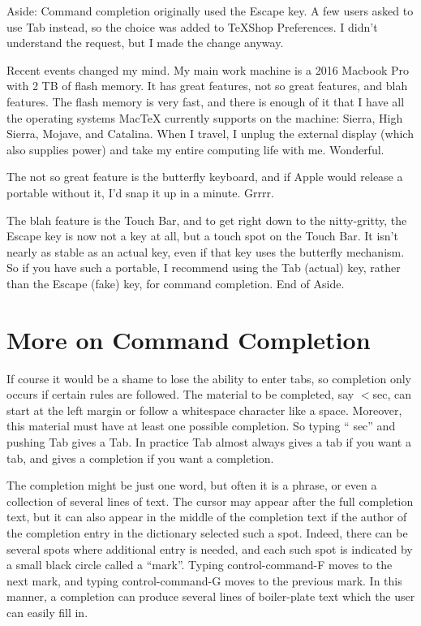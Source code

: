 \documentclass[11pt, oneside]{article}   	%
\begin{document}
Aside: Command completion originally used the Escape key. A few users asked to use Tab instead, so the choice was added to TeXShop Preferences. I didn't understand the request, but I made the change anyway.

Recent events changed my mind. My main work machine is a 2016 Macbook Pro with 2 TB of flash memory. It has great features, not so great features, and blah features. The flash memory is very fast, and there is enough of it that I have all the operating systems MacTeX currently supports on the machine: Sierra, High Sierra, Mojave, and Catalina. When I travel, I unplug the external display (which also supplies power) and take my entire computing life with me. Wonderful.

The not so great feature is the butterfly keyboard, and if Apple would release a portable without it, I'd snap it up in a minute. Grrrr.

The blah feature is the Touch Bar, and to get right down to the nitty-gritty, the Escape key is now not a key at all, but a touch spot on the Touch Bar. It isn't nearly as stable as an actual key, even if that key uses the butterfly mechanism. So if you have such a portable, I recommend using the Tab (actual) key, rather than the Escape (fake) key, for command completion. End of Aside.

\section{More on Command Completion}
 
 If course it would be a shame to lose the ability to enter tabs, so  completion only occurs if certain rules are followed. The material to be completed, say $<$sec, can start at the left margin or follow a whitespace character like a space. Moreover,  this material must have at least one possible completion. So typing `` sec'' and pushing Tab gives a Tab.
 In practice Tab almost always gives a tab if you want a tab, and gives a completion if you want a completion.
 
The completion might be just one word, but often it is a phrase, or even a collection of several lines of text. The cursor may appear after the full completion text, but it can also appear in the middle of the completion text if the author of the completion entry in the dictionary selected such a spot. Indeed, there can be several spots where additional entry is needed, and each such spot is indicated by a small black circle called a ``mark''. Typing control-command-F moves to the next mark, and typing control-command-G moves to the previous mark. In this manner, a completion can produce several lines of boiler-plate text which the user can easily fill in.
\end{document}
